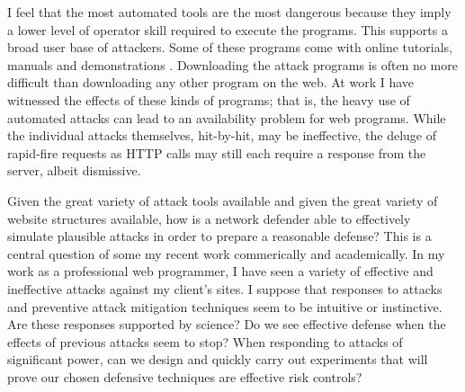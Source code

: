I feel that the most automated tools are the most dangerous because they imply a lower level of operator skill required to execute the programs.  This supports a broad user base of attackers.  Some of these programs come with online tutorials, manuals  and demonstrations .  Downloading the \gls{attack} programs is often no more difficult than downloading any other program on the web.   At work I have witnessed the effects of these kinds of programs; that is, the heavy use of automated attacks can lead to an availability problem for web programs.  While the individual attacks themselves, hit-by-hit, may be ineffective, the deluge of rapid-fire requests as HTTP calls may still each require a response from the server, albeit dismissive.

Given the great variety of  \gls{attack} tools available and given the great variety of website structures available, how is a network defender able to effectively simulate plausible attacks in order to prepare a reasonable defense?  This is a central question of some my recent work commerically and academically.  In my work as a professional web programmer, I have seen a variety of effective and ineffective attacks against my client's sites. I suppose that responses to attacks and preventive  \gls{attack} mitigation techniques seem to be intuitive or instinctive.  Are these responses supported by science?  Do we see effective defense when the effects of previous attacks seem to stop?  When responding to attacks of significant power, can we design and quickly carry out experiments that will prove our chosen defensive techniques are effective risk controls?

